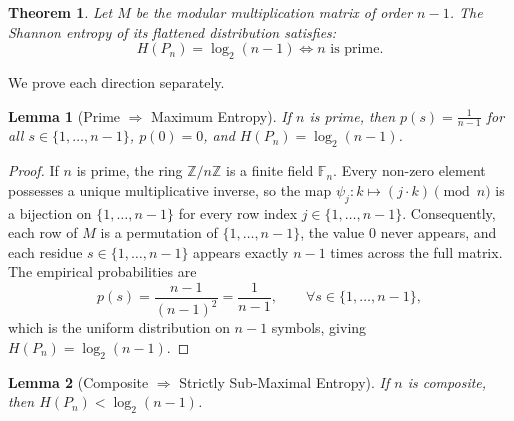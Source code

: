 \documentclass[11pt,twoside]{article}
\newtheorem{theorem}{Theorem}
\newtheorem{lemma}{Lemma}
\begin{document}
	\begin{theorem}
		Let $M$ be the modular multiplication matrix of order $n-1$. The Shannon entropy of its flattened distribution satisfies:
		\begin{equation}
			H(P_n) = \log_2(n-1) \iff n \text{ is prime}.
		\end{equation}
	\end{theorem}
	
	\noindent We prove each direction separately.
	
	\begin{lemma}[Prime $\Rightarrow$ Maximum Entropy]
		If $n$ is prime, then $p(s) = \frac{1}{n-1}$ for all $s \in \{1, \dots, n-1\}$, $p(0) = 0$, and $H(P_n) = \log_2(n-1)$.
	\end{lemma}
	
	\begin{proof}
		If $n$ is prime, the ring $\mathbb{Z}/n\mathbb{Z}$ is a finite field $\mathbb{F}_n$. Every non-zero element possesses a unique multiplicative inverse, so the map $\psi_j: k \mapsto (j \cdot k) \pmod n$ is a bijection on $\{1, \dots, n-1\}$ for every row index $j \in \{1, \dots, n-1\}$. Consequently, each row of $M$ is a permutation of $\{1, \dots, n-1\}$, the value $0$ never appears, and each residue $s \in \{1, \dots, n-1\}$ appears exactly $n-1$ times across the full matrix. The empirical probabilities are
		\begin{equation}
			p(s) = \frac{n-1}{(n-1)^2} = \frac{1}{n-1}, \qquad \forall s \in \{1, \dots, n-1\},
		\end{equation}
		which is the uniform distribution on $n-1$ symbols, giving $H(P_n) = \log_2(n-1)$.
	\end{proof}
	
	\begin{lemma}[Composite $\Rightarrow$ Strictly Sub-Maximal Entropy]
		If $n$ is composite, then $H(P_n) < \log_2(n-1)$.
	\end{lemma}
	
\end{document}
